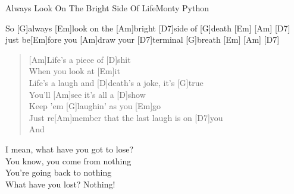 \begin{song}{Always Look On The Bright Side Of Life}{Monty Python}
    \begin{chorus}
        So [G]always [Em]look on the [Am]bright [D7]side of [G]death \hspace{1em}[Em] \hspace{1em} [Am] \hspace{1em} [D7] \\
        [G]just be[Em]fore you [Am]draw your [D7]terminal [G]breath \hspace{1em}[Em] \hspace{1em}[Am] \hspace{1em}[D7]
    \end{chorus}

    \begin{verse}
        [Am]Life's a piece of [D]shit \\
        [G]When you look at [Em]it \\
        [Am]Life's a laugh and [D]death's a joke, it's [G]true \\
        You'll [Am]see it's all a [D]show \\
        Keep 'em [G]laughin' as you [Em]go \\
        Just re[Am]member that the last laugh is on [D7]you \\
        And
    \end{verse}


    I mean, what have you got to lose? \\
    You know, you come from nothing \\
    You're going back to nothing \\
    What have you lost? Nothing! \\

\end{song}
